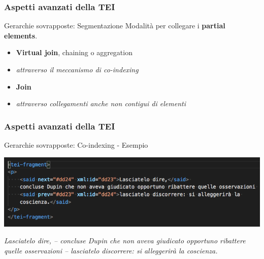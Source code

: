     \begin{frame}
        \frametitle{Aspetti avanzati della TEI}
        \addtocounter{nframe}{1}
        

        \begin{block}{Gerarchie sovrapposte: Segmentazione}
              Modalità per collegare i \textbf{partial elements}.
              \begin{itemize}
                  \item \textbf{Virtual join}, chaining o aggregation
                  \item [] \textit{attraverso il meccanismo di co-indexing}
                  \item \textbf{Join}
                  \item [] \textit{attraverso collegamenti anche non contigui di elementi}
              \end{itemize}
        \end{block}

    \end{frame}

    \begin{frame}
        \frametitle{Aspetti avanzati della TEI}
        \addtocounter{nframe}{1}

        \begin{block}{Gerarchie sovrapposte: Co-indexing - Esempio}
            \begin{center}
                \includegraphics[width=.97\textwidth]{imgs/co-indexing.png}
            \end{center}
        \end{block}

            \tiny\textit{Lasciatelo dire, – concluse Dupin che non aveva giudicato opportuno ribattere quelle osservazioni – lasciatelo discorrere: si alleggerirà la coscienza.}

    \end{frame}

